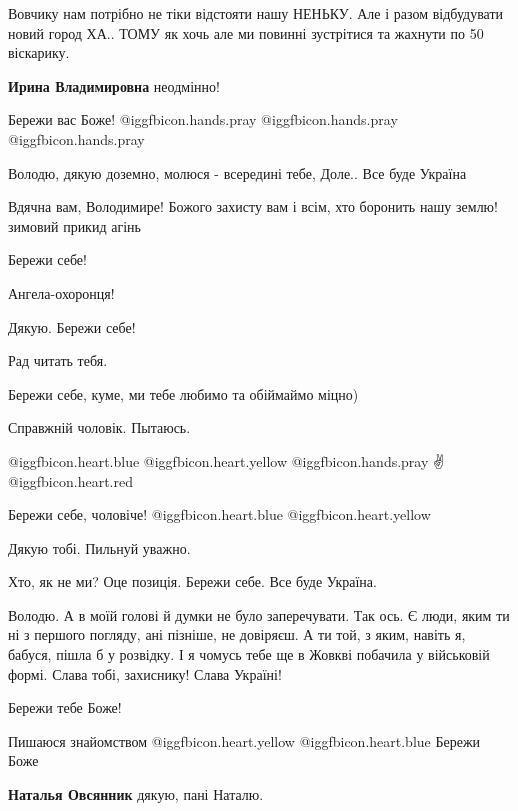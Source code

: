 \begin{itemize}

Вовчику нам потрібно не тіки відстояти нашу НЕНЬКУ. Але і разом відбудувати
новий город ХА.. ТОМУ як хочь але ми повинні зустрітися та жахнути по 50
віскарику.

\textbf{Ирина Владимировна} неодмінно!

Бережи вас Боже!  @igg{fbicon.hands.pray}  @igg{fbicon.hands.pray} @igg{fbicon.hands.pray}

Володю, дякую доземно, молюся - всередині тебе, Доле..
Все буде Україна

Вдячна вам, Володимире! Божого захисту вам і всім, хто боронить нашу землю!
зимовий прикид агінь

Бережи себе!

Ангела-охоронця!

Дякую. Бережи себе!

Рад читать тебя.

Бережи себе, куме, ми тебе любимо та обіймаймо міцно)

Справжній чоловік. Пытаюсь.

 @igg{fbicon.heart.blue}  @igg{fbicon.heart.yellow}  @igg{fbicon.hands.pray} ✌@igg{fbicon.heart.red}

Бережи себе, чоловіче!  @igg{fbicon.heart.blue}  @igg{fbicon.heart.yellow} 

Дякую тобі. Пильнуй уважно.

Хто, як не ми? Оце позиція. Бережи себе. Все буде Україна.


Володю. А в моїй голові й думки не було заперечувати. Так ось. Є люди, яким ти
ні з першого погляду, ані пізніше, не довіряєш. А ти той, з яким, навіть я,
бабуся, пішла б у розвідку. І я чомусь тебе ще в Жовкві побачила у військовій
формі. Слава тобі, захиснику! Слава Україні!


Бережи тебе Боже!

Пишаюся знайомством @igg{fbicon.heart.yellow}  @igg{fbicon.heart.blue}  Бережи Боже

\textbf{Наталья Овсянник} дякую, пані Наталю.


\end{itemize}
